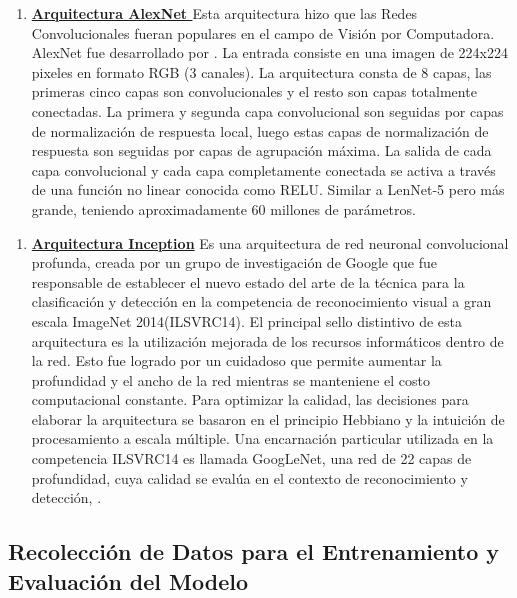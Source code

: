 		\begin{enumerate}
		\item[] {\bf \underline {Arquitectura AlexNet }}\newline
			Esta arquitectura hizo que las Redes Convolucionales fueran populares en el campo de Visión por Computadora. AlexNet fue desarrollado por \citep{Krizhevsky2012}. La entrada consiste en una imagen de 224x224 pixeles en formato RGB (3 canales). La arquitectura consta de 8 capas, las primeras cinco capas son convolucionales y el resto son capas totalmente conectadas. La primera y segunda capa convolucional son seguidas por capas de normalización de respuesta local, luego estas capas de normalización de respuesta son seguidas por capas de agrupación máxima. La salida de cada capa convolucional y cada capa completamente conectada se activa a través de  una función no linear conocida como RELU. Similar a LenNet-5\citep{LeCun} pero más grande, teniendo aproximadamente 60 millones de parámetros.
		\end{enumerate}

		\begin{enumerate}
		\item[] {\bf \underline {Arquitectura Inception}}\newline
			Es una arquitectura de red neuronal convolucional profunda, creada por un grupo de investigación de Google que fue responsable de establecer el nuevo estado del arte de la técnica para la clasificación y detección en la competencia de reconocimiento visual a gran escala ImageNet 2014(ILSVRC14). 
			\vskip 0.1cm
			El principal sello distintivo de esta arquitectura es la utilización mejorada de los recursos informáticos dentro de la red. Esto fue logrado por un cuidadoso que permite aumentar la profundidad y el ancho de la red mientras se manteniene el costo computacional constante. Para optimizar la calidad, las decisiones para elaborar la arquitectura se basaron en el principio Hebbiano y la intuición de procesamiento a escala múltiple. Una encarnación particular utilizada en la competencia ILSVRC14 es llamada GoogLeNet, una red de 22 capas de profundidad, cuya calidad se evalúa en el contexto de reconocimiento y detección, \citep{Inception}.
		\end{enumerate}

	\subsection{Recolección de Datos para el Entrenamiento y Evaluación del Modelo}
		
